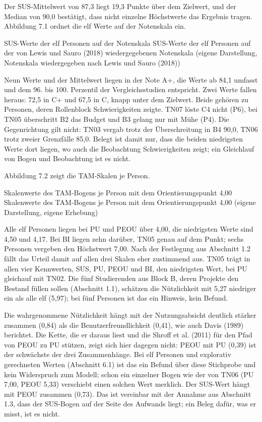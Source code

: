 Der SUS-Mittelwert von 87,3 liegt 19,3 Punkte über dem Zielwert, und der Median von 90,0 bestätigt, dass nicht einzelne Höchstwerte das Ergebnis tragen. Abbildung 7.1 ordnet die elf Werte auf der Notenskala ein.

%
{SUS-Werte der elf Personen auf der Notenskala}%
{SUS-Werte der elf Personen auf der von Lewis und Sauro (2018) wiedergegebenen Notenskala (eigene Darstellung, Notenskala wiedergegeben nach Lewis und Sauro (2018))}

Neun Werte und der Mittelwert liegen in der Note A+, die Werte ab 84,1 umfasst und dem 96. bis 100. Perzentil der Vergleichsstudien entspricht. Zwei Werte fallen heraus: 72,5 in C+ und 67,5 in C, knapp unter dem Zielwert. Beide gehören zu Personen, deren Rollenblock Schwierigkeiten zeigte. TN07 löste C4 nicht (P6), bei TN05 überschritt B2 das Budget und B3 gelang nur mit Mühe (P4). Die Gegenrichtung gilt nicht: TN03 vergab trotz der Überschreitung in B4 90,0, TN06 trotz zweier Grenzfälle 85,0. Belegt ist damit nur, dass die beiden niedrigsten Werte dort liegen, wo auch die Beobachtung Schwierigkeiten zeigt; ein Gleichlauf von Bogen und Beobachtung ist es nicht.

Abbildung 7.2 zeigt die TAM-Skalen je Person.

%
{Skalenwerte des TAM-Bogens je Person mit dem Orientierungspunkt 4,00}%
{Skalenwerte des TAM-Bogens je Person mit dem Orientierungspunkt 4,00 (eigene Darstellung, eigene Erhebung)}

Alle elf Personen liegen bei PU und PEOU über 4,00, die niedrigsten Werte sind 4,50 und 4,17. Bei BI liegen zehn darüber, TN05 genau auf dem Punkt; sechs Personen vergeben den Höchstwert 7,00. Nach der Festlegung aus Abschnitt 1.2 fällt das Urteil damit auf allen drei Skalen eher zustimmend aus. TN05 trägt in allen vier Kennwerten, SUS, PU, PEOU und BI, den niedrigsten Wert, bei PU gleichauf mit TN02. Die fünf Studierenden aus Block B, deren Projekte den Bestand füllen sollen (Abschnitt 1.1), schätzen die Nützlichkeit mit 5,27 niedriger ein als alle elf (5,97); bei fünf Personen ist das ein Hinweis, kein Befund.

Die wahrgenommene Nützlichkeit hängt mit der Nutzungsabsicht deutlich stärker zusammen (0,84) als die Benutzerfreundlichkeit (0,41), wie auch Davis (1989) berichtet. Die Kette, die er daraus liest und die Shroff et al. (2011) für den Pfad von PEOU zu PU stützen, zeigt sich hier dagegen nicht: PEOU mit PU (0,39) ist der schwächste der drei Zusammenhänge. Bei elf Personen und explorativ gerechneten Werten (Abschnitt 6.1) ist das ein Befund über diese Stichprobe und kein Widerspruch zum Modell; schon ein einzelner Bogen wie der von TN06 (PU 7,00, PEOU 5,33) verschiebt einen solchen Wert merklich. Der SUS-Wert hängt mit PEOU zusammen (0,73). Das ist vereinbar mit der Annahme aus Abschnitt 1.3, dass der SUS-Bogen auf der Seite des Aufwands liegt; ein Beleg dafür, was er misst, ist es nicht.

